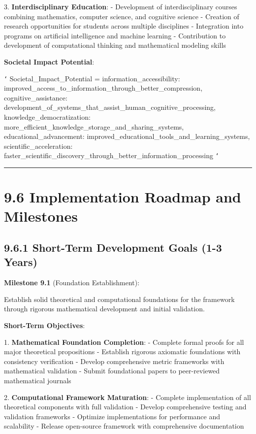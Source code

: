 3. \textbf{Interdisciplinary Education}:
   - Development of interdisciplinary courses combining mathematics, computer science, and cognitive science
   - Creation of research opportunities for students across multiple disciplines
   - Integration into programs on artificial intelligence and machine learning
   - Contribution to development of computational thinking and mathematical modeling skills

\textbf{Societal Impact Potential}:

\texttt{`}
Societal_Impact_Potential = {
    information_accessibility: improved_access_to_information_through_better_compression,
    cognitive_assistance: development_of_systems_that_assist_human_cognitive_processing,
    knowledge_democratization: more_efficient_knowledge_storage_and_sharing_systems,
    educational_advancement: improved_educational_tools_and_learning_systems,
    scientific_acceleration: faster_scientific_discovery_through_better_information_processing
}
\texttt{`}

\hrule

\section{9.6 Implementation Roadmap and Milestones}

\subsection{9.6.1 Short-Term Development Goals (1-3 Years)}

\textbf{Milestone 9.1} (Foundation Establishment):

Establish solid theoretical and computational foundations for the framework through rigorous mathematical development and initial validation.

\textbf{Short-Term Objectives}:

1. \textbf{Mathematical Foundation Completion}:
   - Complete formal proofs for all major theoretical propositions
   - Establish rigorous axiomatic foundations with consistency verification
   - Develop comprehensive metric frameworks with mathematical validation
   - Submit foundational papers to peer-reviewed mathematical journals

2. \textbf{Computational Framework Maturation}:
   - Complete implementation of all theoretical components with full validation
   - Develop comprehensive testing and validation frameworks
   - Optimize implementations for performance and scalability
   - Release open-source framework with comprehensive documentation

